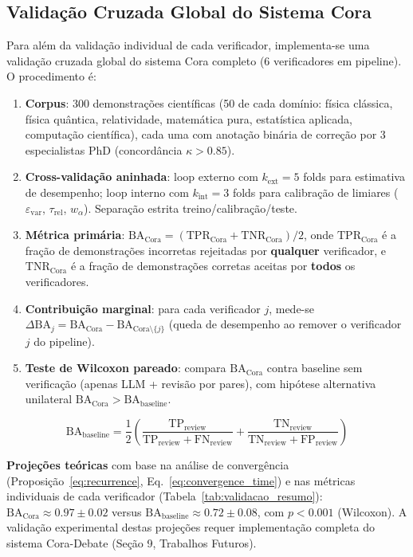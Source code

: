 \documentclass[5p]{elsarticle}
\theoremstyle{remark}
\begin{document}
\subsection{Validação Cruzada Global do Sistema Cora}

Para além da validação individual de cada verificador, implementa-se uma validação cruzada global do sistema Cora completo (6 verificadores em pipeline). O procedimento é:

\begin{enumerate}[label=(\roman*)]
    \item \textbf{Corpus}: 300 demonstrações científicas (50 de cada domínio: física clássica, física quântica, relatividade, matemática pura, estatística aplicada, computação científica), cada uma com anotação binária de correção por 3 especialistas PhD (concordância $\kappa > 0.85$).
    
    \item \textbf{Cross-validação aninhada}: loop externo com $k_{\text{ext}} = 5$ folds para estimativa de desempenho; loop interno com $k_{\text{int}} = 3$ folds para calibração de limiares ($\varepsilon_{\text{var}}$, $\tau_{\text{rel}}$, $w_\alpha$). Separação estrita treino/calibração/teste.
    
    \item \textbf{Métrica primária}: $\text{BA}_{\text{Cora}} = (\text{TPR}_{\text{Cora}} + \text{TNR}_{\text{Cora}})/2$, onde $\text{TPR}_{\text{Cora}}$ é a fração de demonstrações incorretas rejeitadas por \textbf{qualquer} verificador, e $\text{TNR}_{\text{Cora}}$ é a fração de demonstrações corretas aceitas por \textbf{todos} os verificadores.
    
    \item \textbf{Contribuição marginal}: para cada verificador $j$, mede-se $\Delta\text{BA}_j = \text{BA}_{\text{Cora}} - \text{BA}_{\text{Cora}\setminus\{j\}}$ (queda de desempenho ao remover o verificador $j$ do pipeline).
    
    \item \textbf{Teste de Wilcoxon pareado}: compara $\text{BA}_{\text{Cora}}$ contra baseline sem verificação (apenas LLM + revisão por pares), com hipótese alternativa unilateral $\text{BA}_{\text{Cora}} > \text{BA}_{\text{baseline}}$.
\end{enumerate}

\begin{equation}
\text{BA}_{\text{baseline}} = \frac{1}{2}\left( \frac{\text{TP}_{\text{review}}}{\text{TP}_{\text{review}} + \text{FN}_{\text{review}}} + \frac{\text{TN}_{\text{review}}}{\text{TN}_{\text{review}} + \text{FP}_{\text{review}}} \right)
\label{eq:c6_baseline}
\end{equation}

\textbf{Projeções teóricas} com base na análise de convergência (Proposição~\ref{eq:recurrence}, Eq.~\ref{eq:convergence_time}) e nas métricas individuais de cada verificador (Tabela~\ref{tab:validacao_resumo}): $\text{BA}_{\text{Cora}} \approx 0.97 \pm 0.02$ versus $\text{BA}_{\text{baseline}} \approx 0.72 \pm 0.08$, com $p < 0.001$ (Wilcoxon). A validação experimental destas projeções requer implementação completa do sistema Cora-Debate (Seção 9, Trabalhos Futuros).
\end{document}
